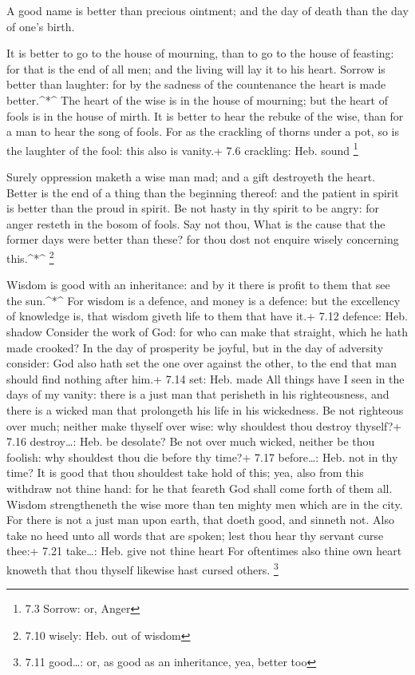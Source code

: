  A good name is better than precious ointment; and the day
of death than the day of one's birth.

 It is better to go to the house of mourning, than to go to
the house of feasting: for that is the end of all men; and the living
will lay it to his heart.  Sorrow is better than laughter:
for by the sadness of the countenance the heart is made better.\^{}*\^{}
 The heart of the wise is in the house of mourning; but the
heart of fools is in the house of mirth.  It is better to
hear the rebuke of the wise, than for a man to hear the song of fools.
 For as the crackling of thorns under a pot, so is the
laughter of the fool: this also is vanity.+ 7.6 crackling: Heb. sound
\footnote{7.3 Sorrow: or, Anger}

 Surely oppression maketh a wise man mad; and a gift
destroyeth the heart.  Better is the end of a thing than the
beginning thereof: and the patient in spirit is better than the proud in
spirit.  Be not hasty in thy spirit to be angry: for anger
resteth in the bosom of fools.  Say not thou, What is the
cause that the former days were better than these? for thou dost not
enquire wisely concerning this.\^{}*\^{} \footnote{7.10 wisely: Heb. out
  of wisdom}

 Wisdom is good with an inheritance: and by it there is
profit to them that see the sun.\^{}*\^{}  For wisdom is a
defence, and money is a defence: but the excellency of knowledge is,
that wisdom giveth life to them that have it.+ 7.12 defence: Heb. shadow
 Consider the work of God: for who can make that straight,
which he hath made crooked?  In the day of prosperity be
joyful, but in the day of adversity consider: God also hath set the one
over against the other, to the end that man should find nothing after
him.+ 7.14 set: Heb. made  All things have I seen in the
days of my vanity: there is a just man that perisheth in his
righteousness, and there is a wicked man that prolongeth his life in his
wickedness.  Be not righteous over much; neither make
thyself over wise: why shouldest thou destroy thyself?+ 7.16
destroy\ldots: Heb. be desolate?  Be not over much wicked,
neither be thou foolish: why shouldest thou die before thy time?+ 7.17
before\ldots: Heb. not in thy time?  It is good that thou
shouldest take hold of this; yea, also from this withdraw not thine
hand: for he that feareth God shall come forth of them all.
 Wisdom strengtheneth the wise more than ten mighty men
which are in the city.  For there is not a just man upon
earth, that doeth good, and sinneth not.  Also take no heed
unto all words that are spoken; lest thou hear thy servant curse thee:+
7.21 take\ldots: Heb. give not thine heart  For oftentimes
also thine own heart knoweth that thou thyself likewise hast cursed
others. \footnote{7.11 good\ldots: or, as good as an inheritance, yea,
  better too}

